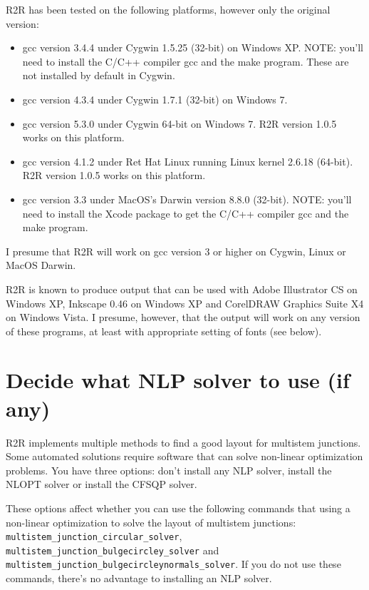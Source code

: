 \documentclass[letterpaper,12pt]{report}
\begin{document}
R2R has been tested on the following platforms, however only the original version:
\begin{itemize}
\item gcc version 3.4.4 under Cygwin 1.5.25 (32-bit) on Windows XP.  NOTE: you'll need to install the C/C++ compiler gcc and the make program.  These are not installed by default in Cygwin.
\item gcc version 4.3.4 under Cygwin 1.7.1 (32-bit) on Windows 7.
\item gcc version 5.3.0 under Cygwin 64-bit on Windows 7.  R2R version 1.0.5 works on this platform.
\item gcc version 4.1.2 under Ret Hat Linux running Linux kernel 2.6.18 (64-bit).  R2R version 1.0.5 works on this platform.
\item gcc version 3.3 under MacOS's Darwin version 8.8.0 (32-bit).  NOTE: you'll need to install the Xcode package to get the C/C++ compiler gcc and the make program.
\end{itemize}
I presume that R2R will work on gcc version 3 or higher on Cygwin, Linux or MacOS Darwin.

R2R is known to produce output that can be used with Adobe Illustrator CS on Windows XP, Inkscape 0.46 on Windows XP and CorelDRAW Graphics Suite X4 on Windows Vista.
I presume, however, that the output will work on any version of these programs, at least
with appropriate setting of fonts (see below).

\section{Decide what NLP solver to use (if any)}

R2R implements multiple methods to find a good layout for multistem junctions.  Some automated solutions require software that can solve non-linear optimization problems.  You have three options: don't install any NLP solver, install the NLOPT solver or install the CFSQP solver.

These options affect whether you can use the following commands that using a non-linear optimization to solve the layout of multistem junctions: {\tt multistem\_junction\_circular\_solver}, {\tt multistem\_junction\_bulgecircley\_solver} and {\tt multistem\_junction\_bulgecircleynormals\_solver}.  If you do not use these commands, there's no advantage to installing an NLP solver.
\end{document}
